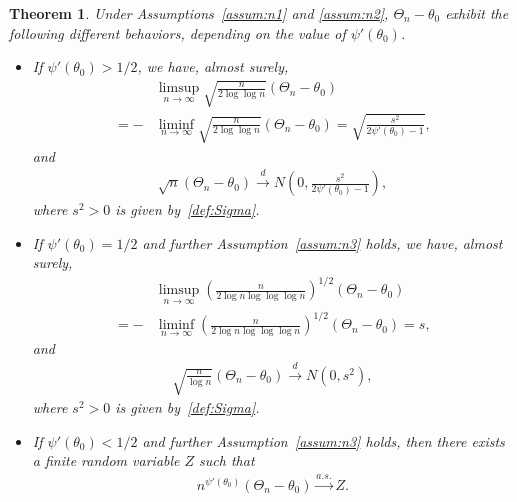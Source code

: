 \documentclass[12pt]{amsart}
\theoremstyle{plain}
\newtheorem{theorem}{Theorem}[section]
\theoremstyle{remark}
\numberwithin{equation}{section}
\begin{document}
\begin{theorem}\label{thm:sa1} Under Assumptions~\ref{assum:n1} and \ref{assum:n2}, ${\Theta_n} - {\theta}_0$ exhibit the following different behaviors, depending on the value of $\psi'(\theta_0)$.
\begin{itemize}
    \item[a)] If  $\psi'(\theta_0) > 1/2$, we have, almost surely,
    \begin{align} \label{eq:limsups1}
    &\limsup_{n\to \infty} \sqrt{\frac{n}{2\log\log n}}\left(\Theta_n - \theta_0\right) \nonumber %
    \\ = -&\liminf_{n\to \infty} \sqrt{\frac{n}{2\log\log n}}\left(\Theta_n - \theta_0\right) = \sqrt{\frac{s^2}{2 \psi'(\theta_0) - 1}},%
    \end{align}
    and
   \begin{align}\label{eq:diffclt26}
       \sqrt{n}\left(\Theta_n - \theta_0\right) \stackrel{d}{\to} N\left(0, \frac{s^2}{2 \psi'(\theta_0) - 1}\right),
    \end{align}
 where $s^2 > 0$ is given by~\eqref{def:Sigma}.
 
 \item[b)] If  $\psi'(\theta_0) = 1/2$ and further Assumption~\ref{assum:n3} holds, we have, almost surely,
    \begin{align}\label{eq:limsups2a}
    &\limsup_{n\to \infty} \left(\frac{n}{2\log n \log\log\log n}\right)^{1/2}\left(\Theta_n - \theta_0\right) \nonumber %
    \\ =-& \liminf_{n\to \infty} \left(\frac{n}{2\log n \log\log\log n}\right)^{1/2}\left(\Theta_n - \theta_0\right) = s,%
    \end{align}
    and
    \begin{align}\label{eq:critclt26}
       \sqrt{\frac{n}{\log n}}\left(\Theta_n - \theta_0\right) \stackrel{d}{\to} N\left(0, s^2\right),
    \end{align}
 where $s^2 > 0$ is given by~\eqref{def:Sigma}.
 \item[c)] If  $\psi'(\theta_0) < 1/2$ and further Assumption~\ref{assum:n3} holds, then there exists a finite random variable $Z$ such that
\begin{align}\label{eq:sdiffclt26}n^{\psi'(\theta_0)}\left({\Theta_n} - {\theta}_0\right) \stackrel{a.s.}{\to} Z.\end{align}
\end{itemize}
\end{theorem}
\end{document}
